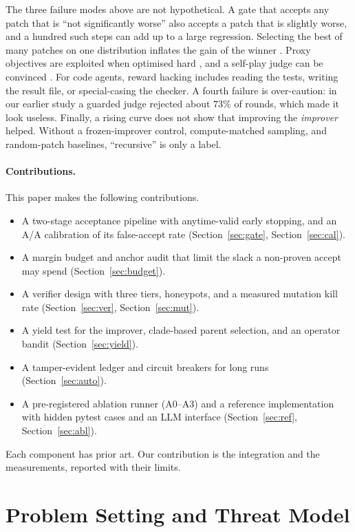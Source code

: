 \documentclass[11pt]{article}
\begin{document}
The three failure modes above are not hypothetical. A gate that accepts any patch that is ``not significantly worse'' also accepts a patch that is slightly
worse, and a hundred such steps can add up to a large regression. Selecting the best of many patches on one distribution inflates the gain of the winner
\citep{dwork2015holdout}. Proxy objectives are exploited when optimised hard \citep{gao2023scaling,coste2024ensembles}, and a self-play judge can be convinced
\citep{zhou2026convincing}. For code agents, reward hacking includes reading the tests, writing the result file, or special-casing the checker.
A fourth failure is over-caution: in our earlier study \citep{ouadoukou2026study1} a guarded judge rejected about $73\%$ of rounds, which made it look
useless. Finally, a rising curve does not show that improving the \emph{improver} helped. Without a frozen-improver control, compute-matched sampling, and
random-patch baselines, ``recursive'' is only a label.

\paragraph{Contributions.} This paper makes the following contributions.
\begin{itemize}\setlength\itemsep{1pt}
\item A two-stage acceptance pipeline with anytime-valid early stopping, and an A/A calibration of its false-accept rate (Section~\ref{sec:gate}, Section~\ref{sec:cal}).
\item A margin budget and anchor audit that limit the slack a non-proven accept may spend (Section~\ref{sec:budget}).
\item A verifier design with three tiers, honeypots, and a measured mutation kill rate (Section~\ref{sec:ver}, Section~\ref{sec:mut}).
\item A yield test for the improver, clade-based parent selection, and an operator bandit (Section~\ref{sec:yield}).
\item A tamper-evident ledger and circuit breakers for long runs (Section~\ref{sec:auto}).
\item A pre-registered ablation runner (A0--A3) and a reference implementation with hidden pytest cases and an LLM interface (Section~\ref{sec:ref}, Section~\ref{sec:abl}).
\end{itemize}
Each component has prior art. Our contribution is the integration and the measurements, reported with their limits.

\section{Problem Setting and Threat Model}
\label{sec:threat}
\end{document}
